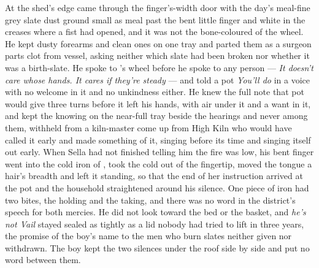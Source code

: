At the shed's edge  came through the finger's-width door with the day's meal-fine grey slate dust ground small as meal past the bent little finger and white in the creases where a fist had opened, and it was not the bone-coloured  of the wheel. He kept dusty forearms and clean ones on one tray and parted them as a surgeon parts clot from vessel, asking neither which slate had been broken nor whether it was a birth-slate. He spoke to 's wheel before he spoke to any person --- \emph{It doesn't care whose hands. It cares if they're steady} --- and told a pot \emph{You'll do} in a voice with no welcome in it and no unkindness either. He knew the full note that pot would give three turns before it left his hands, with air under it and a want in it, and kept the knowing on the near-full tray beside the hearings and never among them, withheld from a kiln-master come up from High Kiln who would have called it early and made something of it, singing before its time and singing itself out early. When Sella had not finished telling him the fire was low, his bent finger went into the cold iron of , took the cold out of the fingertip, moved the tongue a hair's breadth and left it standing, so that the end of her instruction arrived at the pot and the household straightened around his silence. One piece of iron had two bites, the holding and the taking, and there was no word in the district's speech for both mercies. He did not look toward the bed or the basket, and \emph{he's not Vail} stayed sealed as tightly as a lid nobody had tried to lift in three years, the promise of the boy's name to the men who burn slates neither given nor withdrawn. The boy kept the two silences under the roof side by side and put no word between them.

\scenebreak

